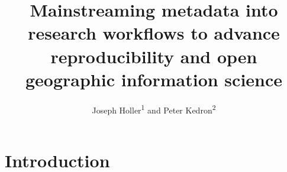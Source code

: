 \documentclass{isprs} %
\begin{document}
\title{Mainstreaming metadata into research workflows to advance reproducibility and open geographic information science}
\date{}


\author{Joseph Holler\textsuperscript{1} and Peter Kedron\textsuperscript{2}}

\address{\textsuperscript{1}Department of Geography, Middlebury College - josephh@middlebury.edu \\
\textsuperscript{2}School of Geographical Sciences and Urban Planning, Arizona State University - peter.kedron@asu.edu}




\commission{}{} %
\workinggroup{} %
\icwg{}   %



\maketitle


\sloppy

\section{Introduction}\label{Introduction}
\end{document}
